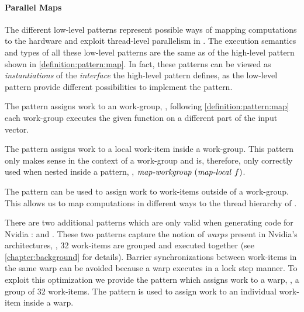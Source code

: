 \paragraph{Parallel Maps}
The different low-level \OpenCL \map patterns represent possible ways of mapping computations to the hardware and exploit thread-level parallelism in \OpenCL.
The execution semantics and types of all these low-level \OpenCL \map patterns are the same as of the high-level \map pattern shown in \autoref{definition:pattern:map}.
In fact, these patterns can be viewed as \emph{instantiations} of the \emph{interface} the high-level \map pattern defines, as the low-level \OpenCL pattern provide different possibilities to implement the \map pattern.

The \mapWorkgroup pattern assigns work to an \OpenCL work-group, \ie, following \autoref{definition:pattern:map} each \OpenCL work-group executes the given function on a different part of the input vector.

The \mapLocal pattern assigns work to a local work-item inside a work-group.
This pattern only makes sense in the context of a work-group and is, therefore, only correctly used when nested inside a \mapWorkgroup pattern, \eg, $\text{\textit{map-workgroup}}\ (\text{\textit{map-local}}\ f)$.

The \mapGlobal pattern can be used to assign work to work-items outside of a work-group.
This allows us to map computations in different ways to the thread hierarchy of \OpenCL.

There are two additional patterns which are only valid when generating code for Nvidia \GPUs:
\mapWarp and \mapLane.
These two patterns capture the notion of \emph{warps} present in Nvidia's \GPU architectures, \ie, 32 work-items are grouped and executed together (see \autoref{chapter:background} for details).
Barrier synchronizations between work-items in the same warp can be avoided because a warp executes in a lock step manner.
To exploit this optimization we provide the \mapWarp pattern which assigns work to a warp, \ie, a group of 32 work-items.
The \mapLane pattern is used to assign work to an individual work-item inside a warp.


